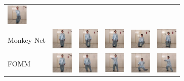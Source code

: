 \documentclass{article}
\begin{document}
\begin{table}[t]
\begin{center}
\begin{small}
\begin{sc}
\begin{tabular}{m{1.5cm}m{1.5cm}m{1.5cm}}
\includegraphics[width=1cm, height=1cm]{images/1_X2Face_5.JPG}\\
Monkey-Net & \includegraphics[width=1cm, height=1cm]{images/2_Monkey-Net_1.JPG} & \includegraphics[width=1cm, height=1cm]{images/2_Monkey-Net_2.JPG} &
\includegraphics[width=1cm, height=1cm]{images/2_Monkey-Net_3.JPG}&
\includegraphics[width=1cm, height=1cm]{images/2_Monkey-Net_4.JPG}&
\includegraphics[width=1cm, height=1cm]{images/2_Monkey-Net_5.JPG}\\
FOMM & \includegraphics[width=1cm, height=1cm]{images/3_FOMM_1.JPG} & \includegraphics[width=1cm, height=1cm]{images/3_FOMM_2.JPG} &
\includegraphics[width=1cm, height=1cm]{images/3_FOMM_3.JPG}&
\includegraphics[width=1cm, height=1cm]{images/3_FOMM_4.JPG}&
\includegraphics[width=1cm, height=1cm]{images/3_FOMM_5.JPG}\\

\end{tabular}
\end{sc}
\end{small}
\end{center}
\end{table}
\end{document}
